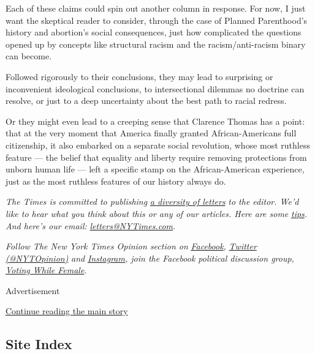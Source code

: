 Each of these claims could spin out another column in response. For now,
I just want the skeptical reader to consider, through the case of
Planned Parenthood's history and abortion's social consequences, just
how complicated the questions opened up by concepts like structural
racism and the racism/anti-racism binary can become.

Followed rigorously to their conclusions, they may lead to surprising or
inconvenient ideological conclusions, to intersectional dilemmas no
doctrine can resolve, or just to a deep uncertainty about the best path
to racial redress.

Or they might even lead to a creeping sense that Clarence Thomas has a
point: that at the very moment that America finally granted
African-Americans full citizenship, it also embarked on a separate
social revolution, whose most ruthless feature --- the belief that
equality and liberty require removing protections from unborn human life
--- left a specific stamp on the African-American experience, just as
the most ruthless features of our history always do.

\emph{The Times is committed to publishing}
\href{https://www.nytimes3xbfgragh.onion/2019/01/31/opinion/letters/letters-to-editor-new-york-times-women.html}{\emph{a
diversity of letters}} \emph{to the editor. We'd like to hear what you
think about this or any of our articles. Here are some}
\href{https://help.nytimes3xbfgragh.onion/hc/en-us/articles/115014925288-How-to-submit-a-letter-to-the-editor}{\emph{tips}}\emph{.
And here's our email:}
\href{mailto:letters@NYTimes.com}{\emph{letters@NYTimes.com}}\emph{.}

\emph{Follow The New York Times Opinion section on}
\href{https://www.facebookcorewwwi.onion/nytopinion}{\emph{Facebook}}\emph{,}
\href{http://twitter.com/NYTOpinion}{\emph{Twitter (@NYTOpinion)}}
\emph{and}
\href{https://www.instagram.com/nytopinion/}{\emph{Instagram}}\emph{,
join the Facebook political discussion group,}
\href{https://www.facebookcorewwwi.onion/groups/votingwhilefemale/}{\emph{Voting
While Female}}\emph{.}

Advertisement

\protect\hyperlink{after-bottom}{Continue reading the main story}

\hypertarget{site-index}{%
\subsection{Site Index}\label{site-index}}

